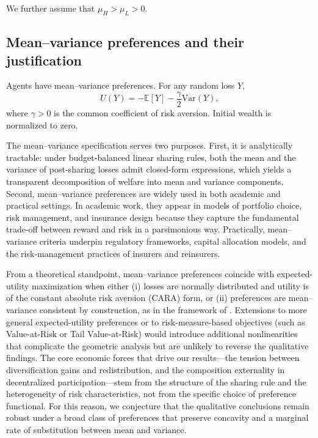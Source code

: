 \documentclass[a4paper,12pt]{article}
\theoremstyle{definition}
\theoremstyle{remark}
\newcommand{\E}{\mathbb{E}}
\newcommand{\Var}{\mathrm{Var}}
\newcommand{\1}{\mathbf{1}}
\begin{document}
We further assume that \(\mu_H>\mu_L>0\).

\subsection{Mean--variance preferences and their justification}

Agents have mean--variance preferences. For any random loss \(Y\),
\begin{equation}\label{eq:utility-general}
U(Y)=-\E[Y]-\frac{\gamma}{2}\Var(Y),
\end{equation}
where \(\gamma>0\) is the common coefficient of risk aversion. Initial wealth is normalized to zero.

The mean--variance specification serves two purposes. First, it is analytically tractable: under budget-balanced linear sharing rules, both the mean and the variance of post-sharing losses admit closed-form expressions, which yields a transparent decomposition of welfare into mean and variance components. Second, mean--variance preferences are widely used in both academic and practical settings. In academic work, they appear in models of portfolio choice, risk management, and insurance design because they capture the fundamental trade-off between reward and risk in a parsimonious way. Practically, mean--variance criteria underpin regulatory frameworks, capital allocation models, and the risk-management practices of insurers and reinsurers.

From a theoretical standpoint, mean--variance preferences coincide with expected-utility maximization when either (i) losses are normally distributed and utility is of the constant absolute risk aversion (CARA) form, or (ii) preferences are mean--variance consistent by construction, as in the framework of \citet{Markowitz1952}. Extensions to more general expected-utility preferences or to risk-measure-based objectives (such as Value-at-Risk or Tail Value-at-Risk) would introduce additional nonlinearities that complicate the geometric analysis but are unlikely to reverse the qualitative findings. The core economic forces that drive our results---the tension between diversification gains and redistribution, and the composition externality in decentralized participation---stem from the structure of the sharing rule and the heterogeneity of risk characteristics, not from the specific choice of preference functional. For this reason, we conjecture that the qualitative conclusions remain robust under a broad class of preferences that preserve concavity and a marginal rate of substitution between mean and variance.
\end{document}
